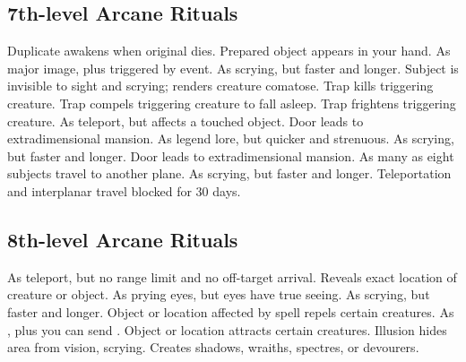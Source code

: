 \subsection{7th-level Arcane Rituals}
\begin{rituallist}
  \F Duplicate awakens when original dies.
   Prepared object appears in your hand.
   As major image, plus triggered by event.
   As scrying, but faster and longer.
   Subject is invisible to sight and scrying; renders creature comatose.
   Trap kills triggering creature.
   Trap compels triggering creature to fall asleep.
   Trap frightens triggering creature.
   As teleport, but affects a touched object.
  \F Door leads to extradimensional mansion.
   As legend lore, but quicker and strenuous.
   As scrying, but faster and longer.
  \F Door leads to extradimensional mansion.
  \F As many as eight subjects travel to another plane.
   As scrying, but faster and longer.
   Teleportation and interplanar travel blocked for 30 days.
\end{rituallist}

\subsection{8th-level Arcane Rituals}
\begin{rituallist}
   As teleport, but no range limit and no off-target arrival.
   Reveals exact location of creature or object.
   As prying eyes, but eyes have true seeing.
   As scrying, but faster and longer.
   Object or location affected by spell repels certain creatures.
   As , plus you can send .
  \F Object or location attracts certain creatures.
   Illusion hides area from vision, scrying.
  \M Creates shadows, wraiths, spectres, or devourers.
\end{rituallist}

